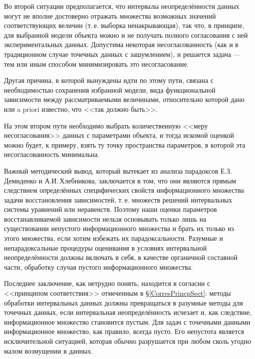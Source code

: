 \documentclass[a5paper,openany]{book}
\begin{document}
Во второй ситуации предполагается, что интервалы неопределённости данных могут 
не вполне достоверно отражать множества возможных значений соответствующих величин
(т.\,е. выборка ненакрывающая), так что, в принципе, для выбранной модели объекта 
можно и не получать полного согласования с ней экспериментальных данных. Допустима 
некоторая несогласованность (как и в традиционном случае точечных данных с зашумлением), 
и решается задача --- тем или иным способом минимизировать это несогласование. 
  
Другая причина, в которой вынуждены идти по этому пути, связана с необходимостью 
сохранения избранной модели, вида функциональной зависимости между рассматриваемыми 
величинами, относительно которой дано или a priori известно, что <<так должно быть>>. 
  
На этом втором пути необходимо выбрать количественную <<меру несогласования>> 
данных с параметрами объекта, и тогда искомой оценкой можно будет, к примеру,
взять ту точку пространства параметров, в которой эта несогласованность 
минимальна. 
  
Важный методический вывод, который вытекает из анализа парадоксов Е.З.\,Деми\-денко и 
А.И.\,Хлебникова, заключается в том, что они являются прямым следствием определённых 
специфических свойств информационного множества задачи восстановления зависимостей, 
т.\,е. множеств решений интервальных системы уравнений или неравенств. Поэтому наши 
оценки параметров восстанавливаемой зависимости нельзя основывать только лишь 
на существовании непустого информационного множества и брать их только из этого 
множества, если хотим избежать их парадоксальности. Разумные и непарадоксальные 
процедуры оценивания в условиях интервальной неопределённости должны включать 
в себя, в качестве органичной составной части, обработку случая пустого 
информационного множества. 
 
Последнее заключение, как нетрудно понять, находится в согласии с <<принципом 
соответствия>> отмеченным в \S\ref{CorresPrincpSect}: методы обработки интервальных 
данных должны превращаться в разумные методы для точечных данных, если интервальная 
неопределённость исчезает и, как следствие, информационное множество становится пустым. 
Для задач с точечными данными информационное множество, как правило, всегда пусто. 
Его непустота является исключительной ситуацией, которая обычно разрушается при любом 
сколь угодно малом возмущении в данных. 
  
\end{document}

